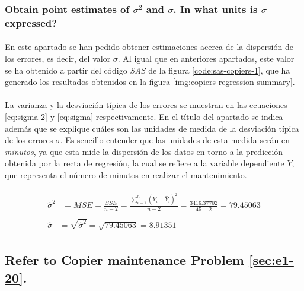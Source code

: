 \documentclass{article}
\begin{document}
      \subsubsection{Obtain point estimates of $\sigma^2$ and $\sigma$. In what units is $\sigma$ expressed?}

        \paragraph{}
        En este apartado se han pedido obtener estimaciones acerca de la dispersión de los errores, es decir, del valor $\sigma$. Al igual que en anteriores apartados, este valor se ha obtenido a partir del código \emph{SAS} de la figura \ref{code:sas-copiers-1}, que ha generado los resultados obtenidos en la figura \ref{img:copiers-regression-summary}.

        \paragraph{}
        La varianza y la desviación típica de los errores se muestran en las ecuaciones \eqref{eq:sigma-2} y \eqref{eq:sigma} respectivamente. En el título del apartado se indica además que se explique cuáles son las unidades de medida de la desviación típica de los errores $\sigma$. Es sencillo entender que las unidades de esta medida serán en \emph{minutos}, ya que esta mide la dispersión de los datos en torno a la predicción obtenida por la recta de regresión, la cual se refiere a la variable dependiente $Y$, que representa el número de minutos en realizar el mantenimiento.

        \begin{align}
        \label{eq:sigma-2}
          \begin{split}
            \widehat{\sigma}^2 &= MSE = \frac{SSE}{n-2} = \frac{\sum_{i=1}^n(Y_i - \widehat{Y}_i)^2}{n-2} = \frac{3416.37702}{45-2} = 79.45063
          \end{split} \\
        \label{eq:sigma}
          \begin{split}
            \widehat{\sigma} &= \sqrt{\widehat{\sigma}^2} = \sqrt{79.45063} = 8.91351
          \end{split}
        \end{align}

    \setcounter{section}{2}
    \setcounter{subsection}{4}
    \subsection{Refer to \textbf{Copier maintenance} Problem \ref{sec:e1-20}.}
    \label{sec:copiers-2.5}
\end{document}
